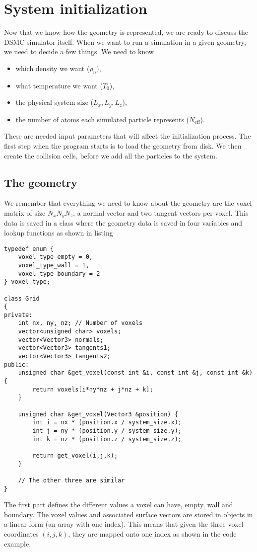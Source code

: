 \section{System initialization}
\label{sec:dsmc_implementation_initialization}
Now that we know how the geometry is represented, we are ready to discuss the DSMC simulator itself. When we want to run a simulation in a given geometry, we need to decide a few things. We need to know
\begin{itemize}
	\item which density we want ($\rho_n)$,
	\item what temperature we want ($T_0$),
	\item the physical system size ($L_x, L_y, L_z$),
	\item the number of atoms each simulated particle represents ($N_\text{eff}$).
\end{itemize}
These are needed input parameters that will affect the initialization process. The first step when the program starts is to load the geometry from disk. We then create the collision cells, before we add all the particles to the system. 
\subsection{The geometry}
We remember that everything we need to know about the geometry are the voxel matrix of size $N_xN_yN_z$, a normal vector and two tangent vectors per voxel. This data is saved in a class  where the geometry data is saved in four variables and lookup functions as shown in listing
\begin{lstlisting}[caption=A Grid class example. This class contains everything we need to know about the geometry., label=lst:dsmc_class_grid]
typedef enum {
    voxel_type_empty = 0,
    voxel_type_wall = 1,
    voxel_type_boundary = 2
} voxel_type;

class Grid
{
private:
	int nx, ny, nz; // Number of voxels
	vector<unsigned char> voxels;
	vector<Vector3> normals;
	vector<Vector3> tangents1;
	vector<Vector3> tangents2;
public:
	unsigned char &get_voxel(const int &i, const int &j, const int &k) {
    	return voxels[i*ny*nz + j*nz + k];
	}

	unsigned char &get_voxel(Vector3 &position) {
		int i = nx * (position.x / system_size.x);
		int j = ny * (position.y / system_size.y);
		int k = nz * (position.z / system_size.z);

    	return get_voxel(i,j,k);
	}

	// The other three are similar
}
\end{lstlisting}
The first part defines the different values a voxel can have, empty, wall and boundary. The voxel values and associated surface vectors are stored in  objects in a linear form (an array with one index). This means that given the three voxel coordinates $(i,j,k)$, they are mapped onto one index as shown in the code example.
